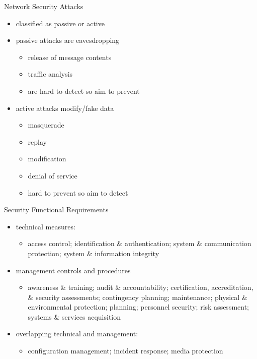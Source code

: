 \documentclass{beamer}
\begin{document}
\begin{frame}{Network Security Attacks}
  \begin{itemize}
    \item  classified as passive or active 
    \item  passive attacks are eavesdropping 
      \begin{itemize}
      \item release of message contents 
      \item traffic analysis 
      \item are hard to detect so aim to prevent 
    \end{itemize}
    \item active attacks modify/fake data 
      \begin{itemize}
      \item masquerade 
      \item replay 
      \item modification 
      \item denial of service 
      \item hard to prevent so aim to detect 
    \end{itemize}
    \end{itemize}
\end{frame}

\begin{frame}{Security Functional Requirements}
  \begin{itemize}
  \item technical measures: 
    \begin{itemize}
      \item access control; identification \& authentication; system \& 
      communication protection; system \& information integrity 
    \end{itemize}
  \item management controls and procedures 
    \begin{itemize}
      \item awareness \& training; audit \& accountability; certification, 
      accreditation, \& security assessments; contingency planning; 
      maintenance; physical \& environmental protection; planning; 
      personnel security; risk assessment; systems \& services 
      acquisition 
    \end{itemize}
  \item overlapping technical and management: 
    \begin{itemize}
      \item configuration management; incident response; media protection
    \end{itemize}
  \end{itemize}
\end{frame}
\end{document}
